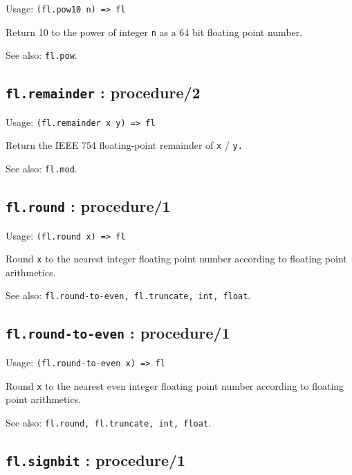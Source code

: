 \documentclass[
]{article}
\newcommand{\passthrough}[1]{#1}
\begin{document}
Usage: \passthrough{\lstinline!(fl.pow10 n) => fl!}

Return 10 to the power of integer \passthrough{\lstinline!n!} as a 64
bit floating point number.

See also: \passthrough{\lstinline!fl.pow!}.

\hypertarget{fl.remainder-procedure2-1}{%
\subsection{\texorpdfstring{\texttt{fl.remainder} :
procedure/2}{fl.remainder : procedure/2}}\label{fl.remainder-procedure2-1}}

Usage: \passthrough{\lstinline!(fl.remainder x y) => fl!}

Return the IEEE 754 floating-point remainder of
\passthrough{\lstinline!x!} / \passthrough{\lstinline!y.!}

See also: \passthrough{\lstinline!fl.mod!}.

\hypertarget{fl.round-procedure1-1}{%
\subsection{\texorpdfstring{\texttt{fl.round} :
procedure/1}{fl.round : procedure/1}}\label{fl.round-procedure1-1}}

Usage: \passthrough{\lstinline!(fl.round x) => fl!}

Round \passthrough{\lstinline!x!} to the nearest integer floating point
number according to floating point arithmetics.

See also:
\passthrough{\lstinline!fl.round-to-even, fl.truncate, int, float!}.

\hypertarget{fl.round-to-even-procedure1-1}{%
\subsection{\texorpdfstring{\texttt{fl.round-to-even} :
procedure/1}{fl.round-to-even : procedure/1}}\label{fl.round-to-even-procedure1-1}}

Usage: \passthrough{\lstinline!(fl.round-to-even x) => fl!}

Round \passthrough{\lstinline!x!} to the nearest even integer floating
point number according to floating point arithmetics.

See also: \passthrough{\lstinline!fl.round, fl.truncate, int, float!}.

\hypertarget{fl.signbit-procedure1-1}{%
\subsection{\texorpdfstring{\texttt{fl.signbit} :
procedure/1}{fl.signbit : procedure/1}}\label{fl.signbit-procedure1-1}}
\end{document}
